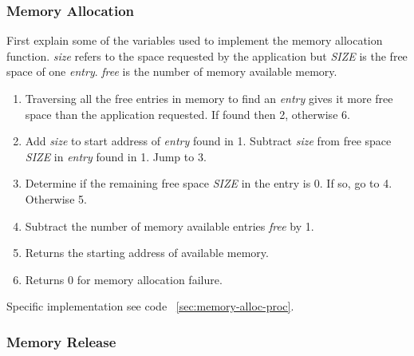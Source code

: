 \documentclass{swfcthesis}
\begin{document}
\subsubsection{Memory Allocation}
\label{sec:memory-allocation}
First explain some of the variables used to implement the memory allocation
function. \emph{size} refers to the space requested by the application but \emph{SIZE}
is the free space of one \emph{entry}. \emph{free} is the number of memory available
memory.

\begin{enumerate}
\item Traversing all the free entries in memory to find an \emph{entry} gives it more free space
  than the application requested. If found then 2, otherwise 6.
\item Add \emph{size} to start address of \emph{entry} found in 1. Subtract 
  \emph{size} from free space \emph{SIZE} in \emph{entry} found in 1. Jump to 3.
\item Determine if the remaining free space \emph{SIZE} in the entry is 0. If so, go to
  4. Otherwise 5.
\item Subtract the number of memory available entries \emph{free} by 1.
\item Returns the starting address of available memory.
\item Returns 0 for memory allocation failure.
\end{enumerate}
Specific implementation see code ~\ref{sec:memory-alloc-proc}.

\subsubsection{Memory Release}
\label{sec:memory-release}
\end{document}
